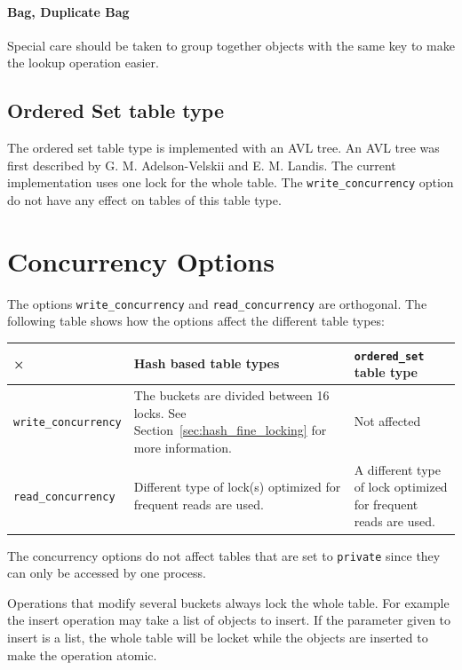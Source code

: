 \documentclass[aps,pre,preprint,nofootinbib]{revtex4}
\begin{document}
\paragraph{Bag, Duplicate Bag}

Special care should be taken to group together objects with the same key to make the lookup operation easier.

\subsection{Ordered Set table type}

The ordered set table type is implemented with an AVL tree.
An AVL tree was first described by G. M. Adelson-Velskii and E. M. Landis.
The current implementation uses one lock for the whole table.
The \verb|write_concurrency| option do not have any effect on tables of this table type.

\section{Concurrency Options} \label{sec:concurrency_options}

The options \verb|write_concurrency| and \verb|read_concurrency| are orthogonal.
The following table shows how the options affect the different table types:

\begin{center}
\begin{tabular}{l|p{5cm}|p{5cm}}
× & Hash based table types & \verb|ordered_set| table type \\ \hline
\verb|write_concurrency| & 
The buckets are divided between 16 locks. See Section~\ref{sec:hash_fine_locking} for more information. 
& Not affected\\ \hline
\verb|read_concurrency| & 
Different type of lock(s) optimized for frequent reads are used. & 
A different type of lock optimized for frequent reads are used.
\end{tabular}
\end{center} 

The concurrency options do not affect tables that are set to \verb|private| since they can only be accessed by one process.

Operations that modify several buckets always lock the whole table.
For example the insert operation may take a list of objects to insert.
If the parameter given to insert is a list, the whole table will be locket while the objects are inserted to make the operation atomic.
\end{document}
